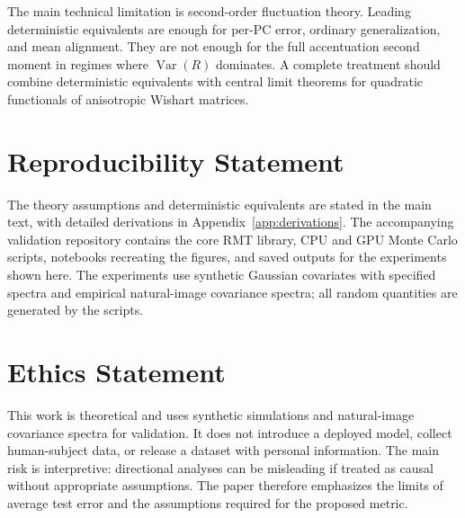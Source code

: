 \documentclass{article}
\begin{document}
The main technical limitation is second-order fluctuation theory. Leading deterministic equivalents are enough for per-PC error, ordinary generalization, and mean alignment. They are not enough for the full accentuation second moment in regimes where $\operatorname{Var}(R)$ dominates. A complete treatment should combine deterministic equivalents with central limit theorems for quadratic functionals of anisotropic Wishart matrices.




\appendix



\section{Reproducibility Statement}

The theory assumptions and deterministic equivalents are stated in the main text, with detailed derivations in Appendix~\ref{app:derivations}. The accompanying validation repository contains the core RMT library, CPU and GPU Monte Carlo scripts, notebooks recreating the figures, and saved outputs for the experiments shown here. The experiments use synthetic Gaussian covariates with specified spectra and empirical natural-image covariance spectra; all random quantities are generated by the scripts.

\section{Ethics Statement}

This work is theoretical and uses synthetic simulations and natural-image covariance spectra for validation. It does not introduce a deployed model, collect human-subject data, or release a dataset with personal information. The main risk is interpretive: directional analyses can be misleading if treated as causal without appropriate assumptions. The paper therefore emphasizes the limits of average test error and the assumptions required for the proposed metric.
\end{document}
